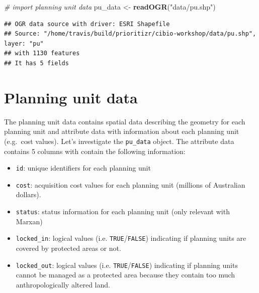 \documentclass[12pt,]{book}
\newenvironment{Shaded}{\begin{snugshade}}{\end{snugshade}}
\newcommand{\KeywordTok}[1]{\textcolor[rgb]{0.13,0.29,0.53}{\textbf{#1}}}
\newcommand{\StringTok}[1]{\textcolor[rgb]{0.31,0.60,0.02}{#1}}
\newcommand{\CommentTok}[1]{\textcolor[rgb]{0.56,0.35,0.01}{\textit{#1}}}
\newcommand{\OperatorTok}[1]{\textcolor[rgb]{0.81,0.36,0.00}{\textbf{#1}}}
\newcommand{\NormalTok}[1]{#1}
\providecommand{\tightlist}{%
  \setlength{\itemsep}{0pt}\setlength{\parskip}{0pt}}
\begin{document}
\begin{Shaded}
\begin{Highlighting}[]
\CommentTok{# import planning unit data}
\NormalTok{pu_data <-}\StringTok{ }\KeywordTok{readOGR}\NormalTok{(}\StringTok{"data/pu.shp"}\NormalTok{)}
\end{Highlighting}
\end{Shaded}

\begin{verbatim}
## OGR data source with driver: ESRI Shapefile 
## Source: "/home/travis/build/prioritizr/cibio-workshop/data/pu.shp", layer: "pu"
## with 1130 features
## It has 5 fields
\end{verbatim}

\begin{Shaded}
\end{Shaded}

\section{Planning unit data}\label{planning-unit-data}

The planning unit data contains spatial data describing the geometry for
each planning unit and attribute data with information about each
planning unit (e.g.~cost values). Let's investigate the
\texttt{pu\_data} object. The attribute data contains 5 columns with
contain the following information:

\begin{itemize}
\tightlist
\item
  \texttt{id}: unique identifiers for each planning unit
\item
  \texttt{cost}: acquisition cost values for each planning unit
  (millions of Australian dollars).
\item
  \texttt{status}: status information for each planning unit (only
  relevant with Marxan)
\item
  \texttt{locked\_in}: logical values (i.e.
  \texttt{TRUE}/\texttt{FALSE}) indicating if planning units are covered
  by protected areas or not.
\item
  \texttt{locked\_out}: logical values (i.e.
  \texttt{TRUE}/\texttt{FALSE}) indicating if planning units cannot be
  managed as a protected area because they contain too much
  anthropologically altered land.
\end{itemize}
\end{document}

